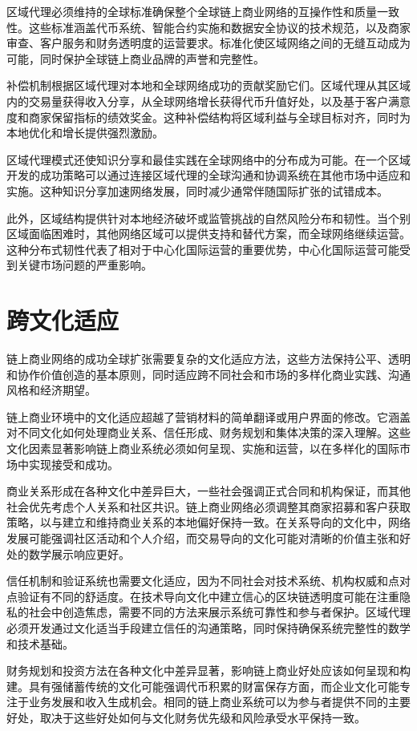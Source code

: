 \documentclass[
  Letterpaper,
]{scrbook}
\begin{document}
区域代理必须维持的全球标准确保整个全球链上商业网络的互操作性和质量一致性。这些标准涵盖代币系统、智能合约实施和数据安全协议的技术规范，以及商家审查、客户服务和财务透明度的运营要求。标准化使区域网络之间的无缝互动成为可能，同时保护全球链上商业品牌的声誉和完整性。

补偿机制根据区域代理对本地和全球网络成功的贡献奖励它们。区域代理从其区域内的交易量获得收入分享，从全球网络增长获得代币升值好处，以及基于客户满意度和商家保留指标的绩效奖金。这种补偿结构将区域利益与全球目标对齐，同时为本地优化和增长提供强烈激励。

区域代理模式还使知识分享和最佳实践在全球网络中的分布成为可能。在一个区域开发的成功策略可以通过连接区域代理的全球沟通和协调系统在其他市场中适应和实施。这种知识分享加速网络发展，同时减少通常伴随国际扩张的试错成本。

此外，区域结构提供针对本地经济破坏或监管挑战的自然风险分布和韧性。当个别区域面临困难时，其他网络区域可以提供支持和替代方案，而全球网络继续运营。这种分布式韧性代表了相对于中心化国际运营的重要优势，中心化国际运营可能受到关键市场问题的严重影响。

\section{跨文化适应}\label{ux8de8ux6587ux5316ux9002ux5e94}

链上商业网络的成功全球扩张需要复杂的文化适应方法，这些方法保持公平、透明和协作价值创造的基本原则，同时适应跨不同社会和市场的多样化商业实践、沟通风格和经济期望。

链上商业环境中的文化适应超越了营销材料的简单翻译或用户界面的修改。它涵盖对不同文化如何处理商业关系、信任形成、财务规划和集体决策的深入理解。这些文化因素显著影响链上商业系统必须如何呈现、实施和运营，以在多样化的国际市场中实现接受和成功。

商业关系形成在各种文化中差异巨大，一些社会强调正式合同和机构保证，而其他社会优先考虑个人关系和社区共识。链上商业网络必须调整其商家招募和客户获取策略，以与建立和维持商业关系的本地偏好保持一致。在关系导向的文化中，网络发展可能强调社区活动和个人介绍，而交易导向的文化可能对清晰的价值主张和好处的数学展示响应更好。

信任机制和验证系统也需要文化适应，因为不同社会对技术系统、机构权威和点对点验证有不同的舒适度。在技术导向文化中建立信心的区块链透明度可能在注重隐私的社会中创造焦虑，需要不同的方法来展示系统可靠性和参与者保护。区域代理必须开发通过文化适当手段建立信任的沟通策略，同时保持确保系统完整性的数学和技术基础。

财务规划和投资方法在各种文化中差异显著，影响链上商业好处应该如何呈现和构建。具有强储蓄传统的文化可能强调代币积累的财富保存方面，而企业文化可能专注于业务发展和收入生成机会。相同的链上商业系统可以为参与者提供不同的主要好处，取决于这些好处如何与文化财务优先级和风险承受水平保持一致。
\end{document}
